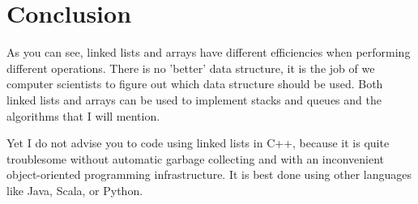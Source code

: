 \section{Conclusion}
As you can see, linked lists and arrays have different efficiencies when performing different operations. There is no 'better' data structure, it is the job of we computer scientists to figure out which data structure should be used. Both linked lists and arrays can be used to implement stacks and queues and the algorithms that I will mention. 

Yet I do not advise you to code using linked lists in C++, because it is quite troublesome without automatic garbage collecting and with an inconvenient object-oriented programming infrastructure. It is best done using other languages like Java, Scala, or Python.

